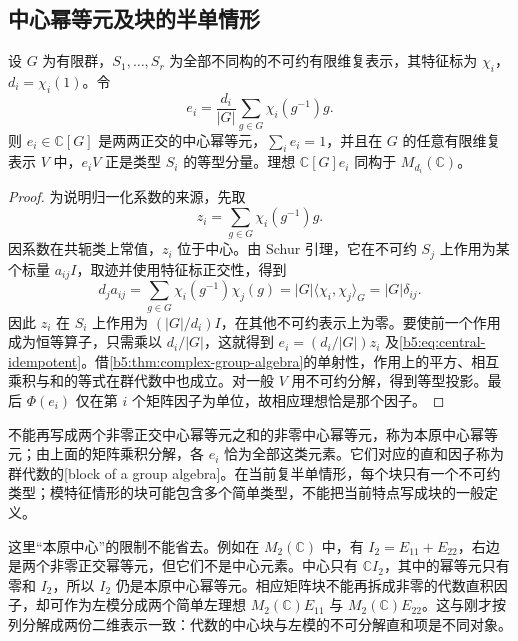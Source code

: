 \subsection{中心幂等元及块的半单情形}
\label{b5:subsec:0203:03}

\begin{theorem}\label{b5:thm:central-character-idempotents}
	设 \(G\) 为有限群，\(S_1,\ldots,S_r\) 为全部不同构的不可约有限维复表示，其特征标为 \(\chi_i\)，\(d_i=\chi_i(1)\)。令
	\begin{equation}\label{b5:eq:central-idempotent}
		e_i=\frac{d_i}{|G|}\sum_{g\in G}\chi_i(g^{-1})g.
	\end{equation}
	则 \(e_i\in\mathbb C[G]\) 是两两正交的中心幂等元，\(\sum_i e_i=1\)，并且在 \(G\) 的任意有限维复表示 \(V\) 中，\(e_iV\) 正是类型 \(S_i\) 的等型分量。理想 \(\mathbb C[G]e_i\) 同构于 \(M_{d_i}(\mathbb C)\)。
\end{theorem}
\begin{proof}
	为说明归一化系数的来源，先取
	\[
		z_i=\sum_{g\in G}\chi_i(g^{-1})g.
	\]
	因系数在共轭类上常值，\(z_i\) 位于中心。由 Schur 引理，它在不可约 \(S_j\) 上作用为某个标量 \(a_{ij}I\)，取迹并使用特征标正交性，得到
	\[
		d_j a_{ij}=\sum_{g\in G}\chi_i(g^{-1})\chi_j(g) =|G|\langle\chi_i,\chi_j\rangle_G=|G|\delta_{ij}.
	\]
	因此 \(z_i\) 在 \(S_i\) 上作用为 \((|G|/d_i)I\)，在其他不可约表示上为零。要使前一个作用成为恒等算子，只需乘以 \(d_i/|G|\)，这就得到 \(e_i=(d_i/|G|)z_i\) 及\eqref{b5:eq:central-idempotent}。借\cref{b5:thm:complex-group-algebra}的单射性，作用上的平方、相互乘积与和的等式在群代数中也成立。对一般 \(V\) 用不可约分解，得到等型投影。最后 \(\Phi(e_i)\) 仅在第 \(i\) 个矩阵因子为单位，故相应理想恰是那个因子。
\end{proof}

不能再写成两个非零正交中心幂等元之和的非零中心幂等元，称为本原中心幂等元；由上面的矩阵乘积分解，各 \(e_i\) 恰为全部这类元素。它们对应的直和因子称为群代数的[block of a group algebra]。在当前复半单情形，每个块只有一个不可约类型；模特征情形的块可能包含多个简单类型，不能把当前特点写成块的一般定义。

\ProseParagraphBreak
这里“本原中心”的限制不能省去。例如在 \(M_2(\mathbb C)\) 中，有 \(I_2=E_{11}+E_{22}\)，右边是两个非零正交幂等元，但它们不是中心元素。中心只有 \(\mathbb C I_2\)，其中的幂等元只有零和 \(I_2\)，所以 \(I_2\) 仍是本原中心幂等元。相应矩阵块不能再拆成非零的代数直积因子，却可作为左模分成两个简单左理想 \(M_2(\mathbb C)E_{11}\) 与 \(M_2(\mathbb C)E_{22}\)。这与刚才按列分解成两份二维表示一致：代数的中心块与左模的不可分解直和项是不同对象。

